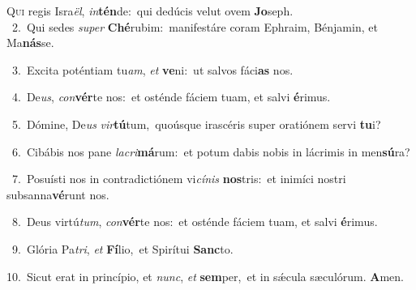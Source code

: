 \lettrine{\initial\textcolor{\initialcolor}{Q}}{ui} regis Isra\-\textit{ël}\-, \textit{in}\-\textbf{tén}de:~\star qui dedúcis velut ovem \textbf{Jo}\-seph.\\
{\numbfont\textcolor{\numbcolor}{~2.}}~Qui sedes \textit{su}\-\textit{per} \textbf{Ché}\-rubim:~\star manifestáre coram Ephraim, Bénjamin, et Ma\-\textbf{nás}\-se.\par
{\numbfont\textcolor{\numbcolor}{~3.}}~Excita poténtiam tu\-\textit{am}\-, \textit{et} \textbf{ve}\-ni:~\star ut salvos fáci\textbf{as} nos.\par
{\numbfont\textcolor{\numbcolor}{~4.}}~De\-\textit{us}\-, \textit{con}\-\textbf{vér}te nos:~\star et osténde fáciem tuam, et salvi \textbf{é}\-rimus.\par
{\numbfont\textcolor{\numbcolor}{~5.}}~Dómine, De\textit{us} \textit{vir}\-\textbf{tú}tum,~\star quoúsque irascéris super oratiónem servi \textbf{tu}\-i?\par
{\numbfont\textcolor{\numbcolor}{~6.}}~Cibábis nos pane \textit{la}\-\textit{cri}\textbf{má}rum:~\star et potum dabis nobis in lácrimis in men\-\textbf{sú}\-ra?\par
{\numbfont\textcolor{\numbcolor}{~7.}}~Posuísti nos in contradictiónem vi\-\textit{cí}\-\textit{nis} \textbf{nos}\-tris:~\star et inimíci nostri subsanna\-\textbf{vé}\-runt nos.\par
{\numbfont\textcolor{\numbcolor}{~8.}}~Deus virtú\-\textit{tum}\-, \textit{con}\-\textbf{vér}te nos:~\star et osténde fáciem tuam, et salvi \textbf{é}\-rimus.\par
{\numbfont\textcolor{\numbcolor}{~9.}}~Glória Pa\-\textit{tri}\-, \textit{et} \textbf{Fí}\-lio,~\star et Spirítui \textbf{Sanc}\-to.\par
{\numbfont\textcolor{\numbcolor}{10.}}~Sicut erat in princípio, et \textit{nunc}\-, \textit{et} \textbf{sem}\-per,~\star et in sǽcula sæculórum. \textbf{A}\-men.\par
